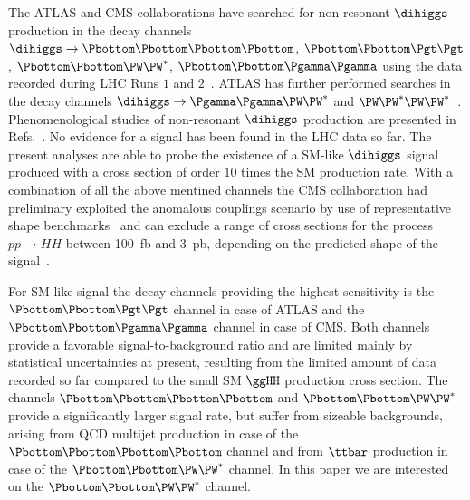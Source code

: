 The ATLAS and CMS collaborations have searched for non-resonant $\dihiggs$ production in the decay channels 
$\dihiggs \to \Pbottom\Pbottom\Pbottom\Pbottom$, $\Pbottom\Pbottom\Pgt\Pgt$, $\Pbottom\Pbottom\PW\PW^{*}$, $\Pbottom\Pbottom\Pgamma\Pgamma$
using the data recorded during LHC Runs $1$ and $2$~\cite{HIG-13-032,HIG-15-013,HIG-17-030,Aad:2015xja,Aaboud:2018knk,Aaboud:2018ftw,Aaboud:2018sfw,Aaboud:2018zhh}.
ATLAS has further performed searches in the decay channels $\dihiggs \to \Pgamma\Pgamma\PW\PW^{*}$ and $\PW\PW^{*}\PW\PW^{*}$~\cite{Aad:2015xja,Aaboud:2018ewm,Aaboud:2018ksn}.
Phenomenological studies of non-resonant $\dihiggs$ production are presented in 
Refs.~\cite{Baur:2002rb,Baur:2002qd,Baur:2003gpa,Baur:2003gp,Dolan:2012rv,Papaefstathiou:2012qe,Baglio:2012np,deLima:2014dta,Wardrope:2014kya,Behr:2015oqq,Li:2015yia,Adhikary:2017jtu}.
No evidence for a signal has been found in the LHC data so far.
The present analyses are able to probe the existence of a SM-like $\dihiggs$ signal produced with a cross section of order $10$ times the SM production rate.  With a combination of all the above mentined channels the CMS collaboration had preliminary exploited the anomalous couplings scenario by use of representative shape benchmarks~\cite{Carvalho:2015ttv} and can exclude a range of cross sections for the process $pp\to HH$ between 100~fb and 3~pb, depending on the predicted shape of the signal~\cite{Sirunyan:2018two}.

For SM-like signal the decay channels providing the highest sensitivity is the $\Pbottom\Pbottom\Pgt\Pgt$ channel in case of ATLAS and the $\Pbottom\Pbottom\Pgamma\Pgamma$ channel in case of CMS.
Both channels provide a favorable signal-to-background ratio and are limited mainly by statistical uncertainties at present,
resulting from the limited amount of data recorded so far compared to the small SM $\ggHH$ production cross section.
The channels $\Pbottom\Pbottom\Pbottom\Pbottom$ and $\Pbottom\Pbottom\PW\PW^{*}$ provide a significantly larger signal rate,
but suffer from sizeable backgrounds,
arising from QCD multijet production in case of the $\Pbottom\Pbottom\Pbottom\Pbottom$ channel 
and from $\ttbar$ production in case of the $\Pbottom\Pbottom\PW\PW^{*}$ channel. In this paper we are interested on the $\Pbottom\Pbottom\PW\PW^{*}$ channel.   %
 
